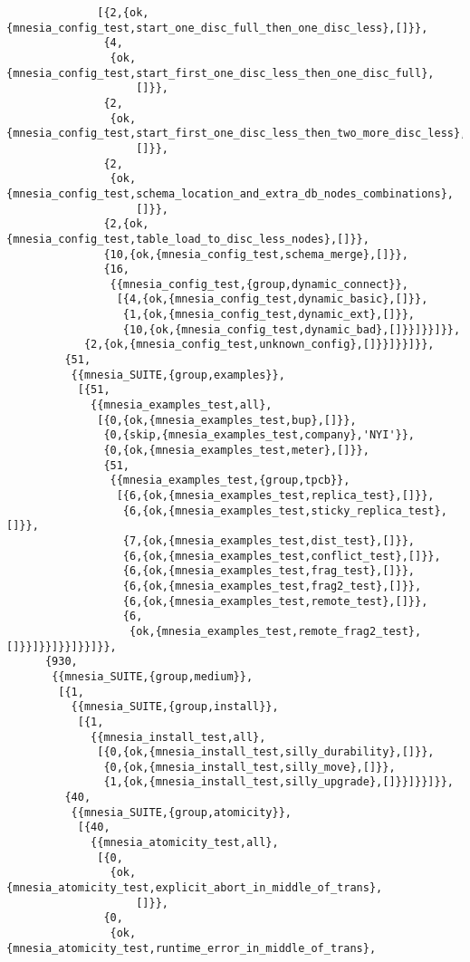 \begin{verbatim}
              [{2,{ok,{mnesia_config_test,start_one_disc_full_then_one_disc_less},[]}},
               {4,
                {ok,{mnesia_config_test,start_first_one_disc_less_then_one_disc_full},
                    []}},
               {2,
                {ok,{mnesia_config_test,start_first_one_disc_less_then_two_more_disc_less},
                    []}},
               {2,
                {ok,{mnesia_config_test,schema_location_and_extra_db_nodes_combinations},
                    []}},
               {2,{ok,{mnesia_config_test,table_load_to_disc_less_nodes},[]}},
               {10,{ok,{mnesia_config_test,schema_merge},[]}},
               {16,
                {{mnesia_config_test,{group,dynamic_connect}},
                 [{4,{ok,{mnesia_config_test,dynamic_basic},[]}},
                  {1,{ok,{mnesia_config_test,dynamic_ext},[]}},
                  {10,{ok,{mnesia_config_test,dynamic_bad},[]}}]}}]}},
            {2,{ok,{mnesia_config_test,unknown_config},[]}}]}}]}},
         {51,
          {{mnesia_SUITE,{group,examples}},
           [{51,
             {{mnesia_examples_test,all},
              [{0,{ok,{mnesia_examples_test,bup},[]}},
               {0,{skip,{mnesia_examples_test,company},'NYI'}},
               {0,{ok,{mnesia_examples_test,meter},[]}},
               {51,
                {{mnesia_examples_test,{group,tpcb}},
                 [{6,{ok,{mnesia_examples_test,replica_test},[]}},
                  {6,{ok,{mnesia_examples_test,sticky_replica_test},[]}},
                  {7,{ok,{mnesia_examples_test,dist_test},[]}},
                  {6,{ok,{mnesia_examples_test,conflict_test},[]}},
                  {6,{ok,{mnesia_examples_test,frag_test},[]}},
                  {6,{ok,{mnesia_examples_test,frag2_test},[]}},
                  {6,{ok,{mnesia_examples_test,remote_test},[]}},
                  {6,
                   {ok,{mnesia_examples_test,remote_frag2_test},[]}}]}}]}}]}}]}},
      {930,
       {{mnesia_SUITE,{group,medium}},
        [{1,
          {{mnesia_SUITE,{group,install}},
           [{1,
             {{mnesia_install_test,all},
              [{0,{ok,{mnesia_install_test,silly_durability},[]}},
               {0,{ok,{mnesia_install_test,silly_move},[]}},
               {1,{ok,{mnesia_install_test,silly_upgrade},[]}}]}}]}},
         {40,
          {{mnesia_SUITE,{group,atomicity}},
           [{40,
             {{mnesia_atomicity_test,all},
              [{0,
                {ok,{mnesia_atomicity_test,explicit_abort_in_middle_of_trans},
                    []}},
               {0,
                {ok,{mnesia_atomicity_test,runtime_error_in_middle_of_trans},

\end{verbatim}
